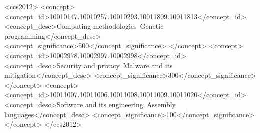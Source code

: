 \documentclass[sigconf]{acmart}
\begin{document}
%
%
\begin{CCSXML}
 <ccs2012>
   <concept>
     <concept_id>10010147.10010257.10010293.10011809.10011813</concept_id>
     <concept_desc>Computing methodologies~Genetic programming</concept_desc>
     <concept_significance>500</concept_significance>
   </concept>
   <concept>
     <concept_id>10002978.10002997.10002998</concept_id>
     <concept_desc>Security and privacy~Malware and its mitigation</concept_desc>
     <concept_significance>300</concept_significance>
   </concept>
     <concept>
     <concept_id>10011007.10011006.10011008.10011009.10011020</concept_id>
     <concept_desc>Software and its engineering~Assembly languages</concept_desc>
   <concept_significance>100</concept_significance>
   </concept>
 </ccs2012>
\end{CCSXML}




\maketitle




 
\end{document}

